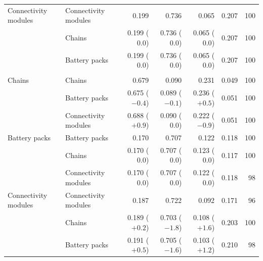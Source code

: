 \begin{table}[htbp]
\begin{tabular}{@{}llrrrrr@{}}
    Connectivity modules & Connectivity modules & 0.199 & 0.736 & 0.065 & 0.207 & 100 \\
     & Chains & 0.199 ($0.0$) & 0.736 ($0.0$) & 0.065 ($0.0$) & 0.207 & 100 \\
     & Battery packs & 0.199 ($0.0$) & 0.736 ($0.0$) & 0.065 ($0.0$) & 0.207 & 100 \\
    \addlinespace
    \multicolumn{7}{@{}l}{\textit{mistral-small-2603}} \\
    Chains & Chains & 0.679 & 0.090 & 0.231 & 0.049 & 100 \\
     & Battery packs & 0.675 ($-0.4$) & 0.089 ($-0.1$) & 0.236 ($+0.5$) & 0.051 & 100 \\
     & Connectivity modules & 0.688 ($+0.9$) & 0.090 ($0.0$) & 0.222 ($-0.9$) & 0.051 & 100 \\
    Battery packs & Battery packs & 0.170 & 0.707 & 0.122 & 0.118 & 100 \\
     & Chains & 0.170 ($0.0$) & 0.707 ($0.0$) & 0.123 ($0.0$) & 0.117 & 100 \\
     & Connectivity modules & 0.170 ($0.0$) & 0.707 ($0.0$) & 0.122 ($0.0$) & 0.118 & 98 \\
    Connectivity modules & Connectivity modules & 0.187 & 0.722 & 0.092 & 0.171 & 96 \\
     & Chains & 0.189 ($+0.2$) & 0.703 ($-1.8$) & 0.108 ($+1.6$) & 0.203 & 100 \\
     & Battery packs & 0.191 ($+0.5$) & 0.705 ($-1.6$) & 0.103 ($+1.2$) & 0.210 & 98 \\
    \bottomrule
  \end{tabular}
\end{table}

